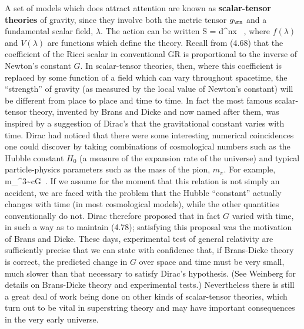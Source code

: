 \documentclass[12pt]{article}
\begin{document}
A set of models which does attract attention are known as 
{\bf scalar-tensor theories} of gravity, since they involve both
the metric tensor $g_\mn$ and a fundamental scalar field, $\lambda$.
The action can be written
\be
  S = \int d^nx \g {}\ ,\label{4.77}
\ee
where $f(\lambda)$ and $V(\lambda)$ are functions which define the
theory.  Recall from (4.68) that the coefficient of the Ricci scalar
in conventional GR is proportional to the inverse of Newton's constant
$G$.  In scalar-tensor theories, then, where this coefficient is replaced
by some function of a field which can vary throughout spacetime,
the ``strength'' of gravity (as measured by the local value of Newton's
constant) will be different from place to place and time to time.
In fact the most famous scalar-tensor theory, invented by Brans and
Dicke and now named after them, was inspired by a suggestion of 
Dirac's that the gravitational constant varies with time.  Dirac had
noticed that there were some interesting numerical coincidences one
could discover by taking combinations of cosmological numbers such as the
Hubble constant $H_0$ (a measure of the expansion rate of the universe)
and typical particle-physics parameters such as the mass of the pion,
$m_\pi$.  For example,
\be
  {{m_\pi^3}}\sim {{cG}}\ .\label{4.78}
\ee
If we assume for the moment that this relation is not simply an
accident, we are faced with the problem that the Hubble ``constant''
actually changes with time (in most cosmological models), while the
other quantities conventionally do not.  Dirac therefore proposed that
in fact $G$ varied with time, in such a way as to maintain (4.78);
satisfying this proposal was the motivation of Brans and Dicke.
These days, experimental test of general relativity are sufficiently
precise that we can state with confidence that, if Brans-Dicke theory
is correct, the predicted change in $G$ over space and time must be
very small, much slower than that necessary to satisfy Dirac's
hypothesis.  (See Weinberg for details on Brans-Dicke theory and
experimental tests.)
Nevertheless there is still a great deal of work being
done on other kinds of scalar-tensor theories, which turn out to be
vital in superstring theory and may have important consequences in 
the very early universe.
\end{document}
